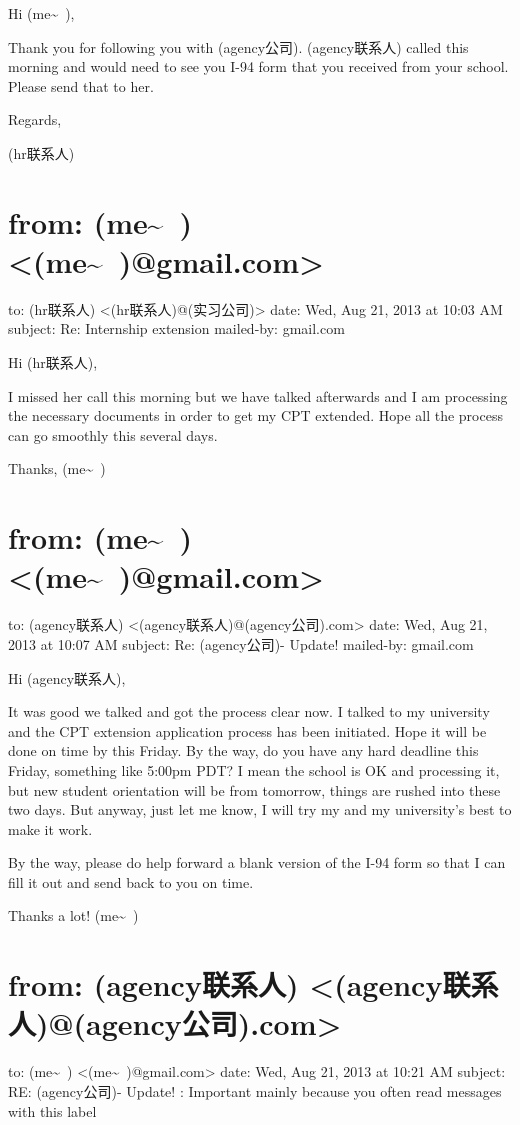 \documentclass[12pt]{book}
\begin{document}
Hi (me\textasciitilde{}~),

Thank you for following you with (agency公司).  (agency联系人) called this morning and would need to see you I-94 form that you received from your school.  Please send that to her. 

Regards,

(hr联系人)


\section{from:         (me\textasciitilde{}~) <(me\textasciitilde{}~)@gmail.com>}
\label{sec-35-8}
to:         (hr联系人) <(hr联系人)@(实习公司)>
date:         Wed, Aug 21, 2013 at 10:03 AM
subject:         Re: Internship extension
mailed-by:         gmail.com

Hi (hr联系人), 

I missed her call this morning but we have talked afterwards and I am processing the necessary documents in order to get my CPT extended. 
Hope all the process can go smoothly this several days. 

Thanks,
(me\textasciitilde{}~)


\section{from:         (me\textasciitilde{}~) <(me\textasciitilde{}~)@gmail.com>}
\label{sec-35-9}
to:         (agency联系人) <(agency联系人)@(agency公司).com>
date:         Wed, Aug 21, 2013 at 10:07 AM
subject:         Re: (agency公司)- Update!
mailed-by:         gmail.com

Hi (agency联系人), 

It was good we talked and got the process clear now. I talked to my university and the CPT extension application process has been initiated. Hope it will be done on time by this Friday. By the way, do you have any hard deadline this Friday, something like 5:00pm PDT? I mean the school is OK and processing it, but new student orientation will be from tomorrow, things are rushed into these two days. But anyway, just let me know, I will try my and my university's best to make it work. 

By the way, please do help forward a blank version of the I-94 form so that I can fill it out and send back to you on time. 

Thanks a lot!
(me\textasciitilde{}~)


\section{from:         (agency联系人) <(agency联系人)@(agency公司).com>}
\label{sec-35-10}
to:         (me\textasciitilde{}~) <(me\textasciitilde{}~)@gmail.com>
date:         Wed, Aug 21, 2013 at 10:21 AM
subject:         RE: (agency公司)- Update!
:         Important mainly because you often read messages with this label
\end{document}

